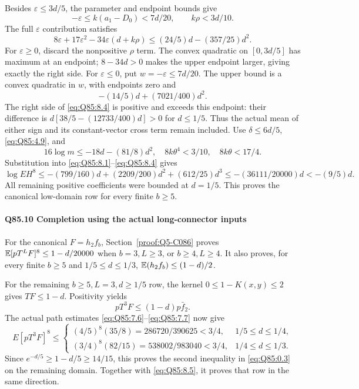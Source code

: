Besides \(\varepsilon\le\allowbreak 3d/5\), the parameter and endpoint bounds give
\[
 -\varepsilon\le k(a_1-D_0)<7d/20,\qquad k\rho<3d/10.
\]
The full \(\varepsilon\) contribution satisfies
\[
 8\varepsilon+17\varepsilon^2-34\varepsilon(d+k\rho)
 \le(24/5)d-(357/25)d^2.                             \tag{Q85.8.4}\label{eq:Q85:8.4}
\]
For \(\varepsilon\ge\allowbreak 0\), discard the nonpositive \(\rho\) term.
The convex quadratic on \([0,\allowbreak 3d/5]\) has maximum at an endpoint;
\(8-34d>\allowbreak 0\) makes the upper endpoint larger, giving exactly the right side.
For \(\varepsilon\le\allowbreak 0\), put \(w=\allowbreak -\varepsilon\le\allowbreak 7d/20\).
The upper bound is a convex quadratic in \(w\), with endpoints zero and
\[
 -(14/5)d+(7021/400)d^2.
\]
The right side of \eqref{eq:Q85:8.4} is positive and exceeds this endpoint:
their difference is \(d[38/5-(12733/400)d]>\allowbreak 0\) for \(d\le\allowbreak 1/5\).
Thus the actual mean of either sign and its constant-vector cross term remain included.
Use \(\delta\le\allowbreak 6d/5\), \eqref{eq:Q85:4.9}, and
\[
 16\log m\le-18d-(81/8)d^2,
 \quad 8k\theta^4<3/10,\quad8k\theta<17/4.
\]
Substitution into \eqref{eq:Q85:8.1}--\eqref{eq:Q85:8.4} gives
\[
 \log EH^8\le-(799/160)d+(2209/200)d^2+(612/25)d^3
 \le-(36111/20000)d<-(9/5)d.                         \tag{Q85.8.5}\label{eq:Q85:8.5}
\]
All remaining positive coefficients were bounded at \(d=\allowbreak 1/5\).
This proves the canonical low-domain row for every finite \(b\ge\allowbreak 5\).

\paragraph{Q85.10 Completion using the actual long-connector inputs}
For the canonical \(F=\allowbreak h_2f_b\), Section~\ref{proof:Q5-C086} proves
\(\mathbb E[pT^LF]^8\le\allowbreak 1-d/20000\) when \(b=\allowbreak 3,\allowbreak L\ge\allowbreak 3\), or \(b\ge\allowbreak 4,\allowbreak L\ge\allowbreak 4\).
It also proves, for every finite \(b\ge\allowbreak 5\) and \(1/5\le\allowbreak  d\le\allowbreak 1/3\),
\(\mathbb E(h_2f_b)\le\allowbreak (1-d)/2\).

For the remaining \(b\ge\allowbreak 5,\allowbreak L=\allowbreak 3,\allowbreak d\ge\allowbreak 1/5\) row, the kernel
\(0\le\allowbreak 1-K(x,\allowbreak y)\le\allowbreak 2\) gives \(TF\le\allowbreak 1-d\). Positivity yields
\[
 pT^3F\le(1-d)p\bar f_2.
\]
The actual path estimates \eqref{eq:Q85:7.6}--\eqref{eq:Q85:7.7} now give
\[
 E[pT^3F]^8\le
 \begin{cases}
 (4/5)^8(35/8)=286720/390625<3/4,&1/5\le d\le1/4,\\
 (3/4)^8(82/15)=538002/983040<3/4,&1/4\le d\le1/3.
 \end{cases}                                                   \tag{Q85.10.1}\label{eq:Q85:10.1}
\]
Since \(e^{-d/5}\ge\allowbreak 1-d/5\ge\allowbreak 14/15\), this proves the second inequality in
\eqref{eq:Q85:0.3} on the remaining domain.
Together with \eqref{eq:Q85:8.5}, it proves that row in the same direction.


